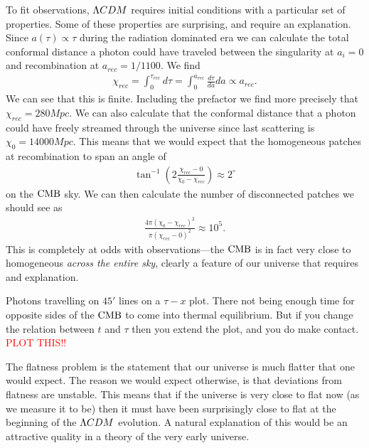     To fit observations, $\Lambda CDM$ requires initial conditions with a particular set of properties.
    Some of these properties are surprising, and require an explanation.
    Since $a(\tau)\propto \tau$ during the radiation dominated era we can calculate
    the total conformal distance a photon could have traveled between the singularity at $a_i=0$
    and recombination at $a_{rec}=1/1100$. We find
    \begin{align}
        \chi_{rec} = \int_{0}^{\tau_{rec}} d \tau = \int_{0}^{a_{rec}} \frac{d\tau}{da}da \propto a_{rec}.
    \end{align}
    We can see that this is finite.
    Including the prefactor we find more precisely that $\chi_{rec}=280Mpc$.
    We can also calculate that the conformal distance that a photon could have
    freely streamed through the universe since
    last scattering is $\chi_0=14000Mpc$.
    This means that we would expect that the homogeneous patches at recombination to span
    an angle of
    \begin{align}
        \tan^{-1}\left(2\frac{\chi_{rec}-0}{\chi_{0}-\chi_{rec}}\right) \approx 2^{\circ}
    \end{align}
    on the $\text{CMB}$ sky. We can then calculate the number of disconnected patches
    we should see as
    \begin{align}
        \frac{4\pi(\chi_{0}-\chi_{rec})^2}{\pi(\chi_{rec}-0)^2} \approx 10^5.
    \end{align}
    This is completely at odds with observations---the $\text{CMB}$ is in fact very close to
    homogeneous \textit{across the entire sky}, clearly a feature of our universe
    that requires and explanation.


    Photons travelling on $45'$ lines on a $\tau-x$ plot. There not being enough time for opposite
    sides of the $\text{CMB}$ to come into thermal equilibrium. But if you change the relation between
    $t$ and $\tau$ then you extend the plot, and you do make contact. \textcolor{red}{PLOT THIS!!}


    The flatness problem is the statement that our universe is much flatter that one would expect.
    The reason we would expect otherwise, is that deviations from flatness are unstable.
    This means that if the universe is very close to flat now (as we measure it to be)
    then it must have been surprisingly close to flat at the beginning of the $\Lambda CDM$
    evolution. A natural explanation of this would be an attractive quality in a
    theory of the very early universe.


